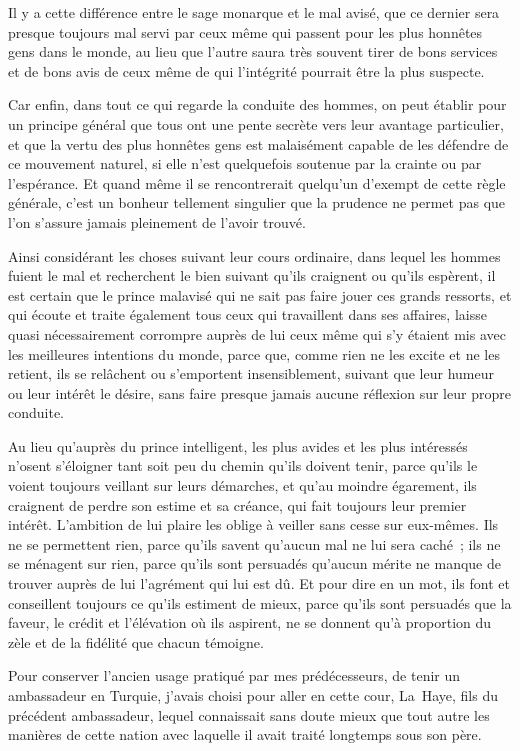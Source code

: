 \documentclass[french,twoside]{book} %
\begin{document}
Il y a cette différence entre le sage monarque et le mal avisé, que ce dernier sera presque toujours mal servi par ceux même qui passent pour les plus honnêtes gens dans le monde, au lieu que l’autre saura très souvent tirer de bons services et de bons avis de ceux même de qui l’intégrité pourrait être la plus suspecte.\par
Car enfin, dans tout ce qui regarde la conduite des hommes, on peut établir pour un principe général que tous ont une pente secrète vers leur avantage particulier, et que la vertu des plus honnêtes gens est malaisément capable de les défendre de ce mouvement naturel, si elle n’est quelquefois soutenue par la crainte ou par l’espérance. Et quand même il se rencontrerait quelqu’un d’exempt de cette règle générale, c’est un bonheur tellement singulier que la prudence ne permet pas que l’on s’assure jamais pleinement de l’avoir trouvé.\par
Ainsi considérant les choses suivant leur cours ordinaire, dans lequel les hommes fuient le mal et recherchent le bien suivant qu’ils craignent ou qu’ils espèrent, il est certain que le prince malavisé qui ne sait pas faire jouer ces grands ressorts, et qui écoute et traite également tous ceux qui travaillent dans ses affaires, laisse quasi nécessairement corrompre auprès de lui ceux même qui s’y étaient mis avec les meilleures intentions du monde, parce que, comme rien ne les excite et ne les retient, ils se relâchent ou s’emportent insensiblement, suivant que leur humeur ou leur intérêt le désire, sans faire presque jamais aucune réflexion sur leur propre conduite.\par
Au lieu qu’auprès du prince intelligent, les plus avides et les plus intéressés n’osent s’éloigner tant soit peu du chemin qu’ils doivent tenir, parce qu’ils le voient toujours veillant sur leurs démarches, et qu’au moindre égarement, ils craignent de perdre son estime et sa créance, qui fait toujours leur premier intérêt. L’ambition de lui plaire les oblige à veiller sans cesse sur eux-mêmes. Ils ne se permettent rien, parce qu’ils savent qu’aucun mal ne lui sera caché ; ils ne se ménagent sur rien, parce qu’ils sont persuadés qu’aucun mérite ne manque de trouver auprès de lui l’agrément qui lui est dû. Et pour dire en un mot, ils font et conseillent toujours ce qu’ils estiment de mieux, parce qu’ils sont persuadés que la faveur, le crédit et l’élévation où ils aspirent, ne se donnent qu’à proportion du zèle et de la fidélité que chacun témoigne.\par
Pour conserver l’ancien usage pratiqué par mes prédécesseurs, de tenir un ambassadeur en Turquie, j’avais choisi pour aller en cette cour, La Haye, fils du précédent ambassadeur, lequel connaissait sans doute mieux que tout autre les manières de cette nation avec laquelle il avait traité longtemps sous son père.\par
\end{document}
